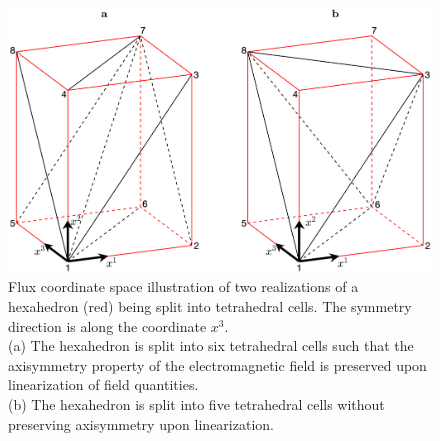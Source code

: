 \documentclass{TheMartianReport}
\begin{document}
\begin{figure}[h]
	\centerline{\includegraphics[keepaspectratio,width=1.05\linewidth, trim=120 50 100 5, clip]{figures/tetraeder.eps}}
	\captionsetup{justification=raggedright,singlelinecheck=false,textfont=footnotesize,labelfont=footnotesize}
	\caption{Flux coordinate space illustration of two realizations of a hexahedron (red) being split into tetrahedral cells. The symmetry direction is along the coordinate $x^3$.\\
	(a) The hexahedron is split into six tetrahedral cells such that the axisymmetry property of the electromagnetic field is preserved upon linearization of field quantities.\\
	(b) The hexahedron is split into five tetrahedral cells without preserving axisymmetry upon linearization.}
	\label{fig:splitting_hexahedra}
\end{figure}
\end{document}
